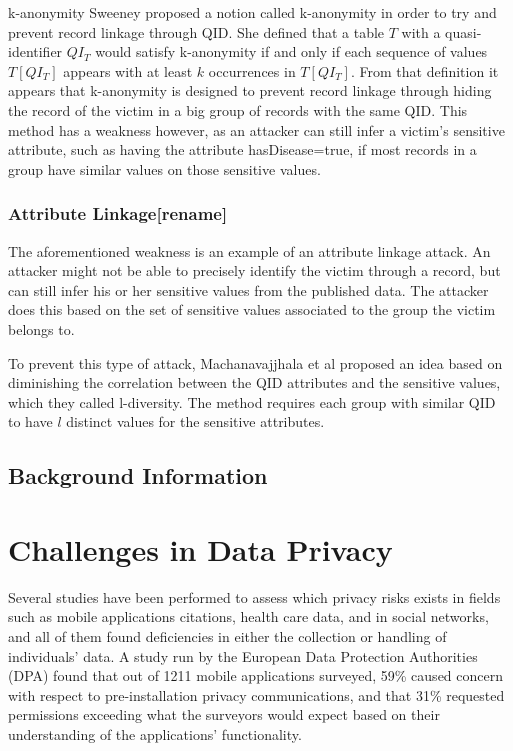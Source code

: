 k-anonymity  
Sweeney\cite{sweeney2002k} proposed a notion called k-anonymity in order to try and prevent record linkage through QID. She defined that a table $T$ with a quasi-identifier $QI_T$ would satisfy k-anonymity if and only if each sequence of values $T[QI_T]$ appears with at least $k$ occurrences in $T[QI_T]$. From that definition it appears that k-anonymity is designed to prevent record linkage through hiding the record of the victim in a big group of records with the same QID. This method has a weakness however, as an attacker can still infer a victim's sensitive attribute, such as having the attribute hasDisease=true, if most records in a group have similar values on those sensitive values. 

\subsubsection{Attribute Linkage[rename]}
The aforementioned weakness is an example of an attribute linkage attack. An attacker might not be able to precisely identify the victim through a record, but can still infer his or her sensitive values from the published data. The attacker does this based on the set of sensitive values associated to the group the victim belongs to. 

To prevent this type of attack, Machanavajjhala et al\cite{machanavajjhala2007diversity} proposed an idea based on diminishing the correlation between the QID attributes and the sensitive values, which they called l-diversity. The method requires each group with similar QID to have $l$ distinct values for the sensitive attributes. 


\subsection{Background Information}	


\section{Challenges in Data Privacy}

Several studies have been performed to assess which privacy risks exists in fields such as mobile applications {citations}, health care data, and in social networks, and all of them found deficiencies in either the collection or handling of individuals' data. A study run by the European Data Protection Authorities (DPA) found that out of 1211 mobile applications surveyed, 59\% caused concern with respect to pre-installation privacy communications, and that 31\%  requested permissions exceeding what the surveyors would expect based on their understanding of the applications’ functionality\cite{EUprivacySweep2014}. 

